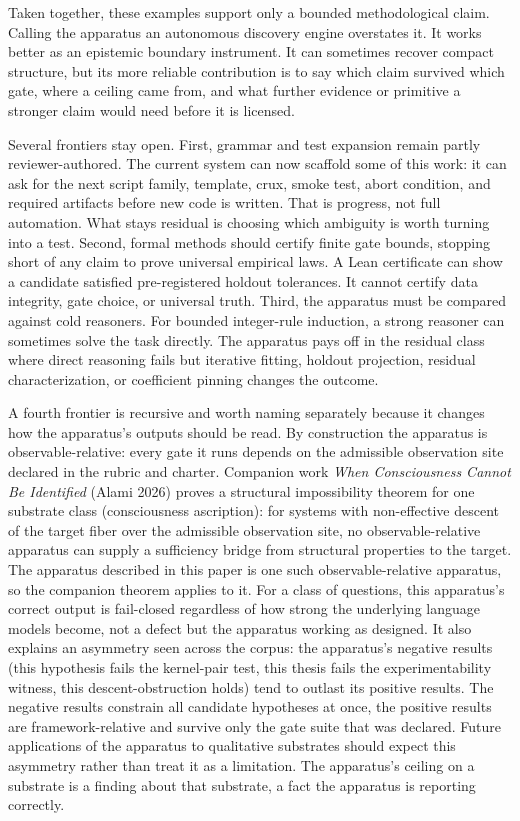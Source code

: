\documentclass[
  11pt,
]{article}
\begin{document}
Taken together, these examples support only a bounded methodological
claim. Calling the apparatus an autonomous discovery engine overstates
it. It works better as an epistemic boundary instrument. It can sometimes
recover compact structure, but its more reliable contribution is to say
which claim survived which gate, where a ceiling came from, and what
further evidence or primitive a stronger claim would need before it is
licensed.

Several frontiers stay open. First, grammar and test expansion remain
partly reviewer-authored. The current system can now scaffold some of this
work: it can ask for the next script family, template, crux,
smoke test, abort condition, and required artifacts before new code is
written. That is progress, not full automation. What stays residual is
choosing which ambiguity is worth turning into a test.
Second, formal methods should certify finite gate bounds, stopping short
of any claim to prove universal empirical laws. A Lean certificate can
show a candidate satisfied pre-registered holdout tolerances. It cannot
certify data integrity, gate choice, or universal truth. Third, the
apparatus must be compared against cold reasoners. For bounded
integer-rule induction, a strong reasoner can sometimes solve the task
directly. The apparatus pays off in the residual class where direct
reasoning fails but iterative fitting, holdout projection, residual
characterization, or coefficient pinning changes the outcome.

A fourth frontier is recursive and worth naming separately because it
changes how the apparatus's outputs should be read. By construction the
apparatus is observable-relative: every gate it runs depends on the
admissible observation site declared in the rubric and charter. Companion
work \emph{When Consciousness Cannot Be Identified} (Alami 2026) proves a
structural impossibility theorem for one substrate class (consciousness
ascription): for systems with non-effective descent of the target fiber
over the admissible observation site, no observable-relative apparatus can
supply a sufficiency bridge from structural properties to the target. The
apparatus described in this paper is one such observable-relative
apparatus, so the companion theorem applies to it. For a class of
questions, this apparatus's correct output is fail-closed regardless of
how strong the underlying language models become, not a defect but
the apparatus working as designed. It also explains an asymmetry seen
across the corpus: the apparatus's negative results (this hypothesis fails
the kernel-pair test, this thesis fails the experimentability witness,
this descent-obstruction holds) tend to outlast its positive
results. The negative results constrain all candidate hypotheses
at once, the positive results are framework-relative and survive
only the gate suite that was declared. Future applications of the
apparatus to qualitative substrates should expect this asymmetry rather
than treat it as a limitation. The apparatus's ceiling on a substrate is a
finding about that substrate, a fact the apparatus is reporting correctly.
\end{document}
